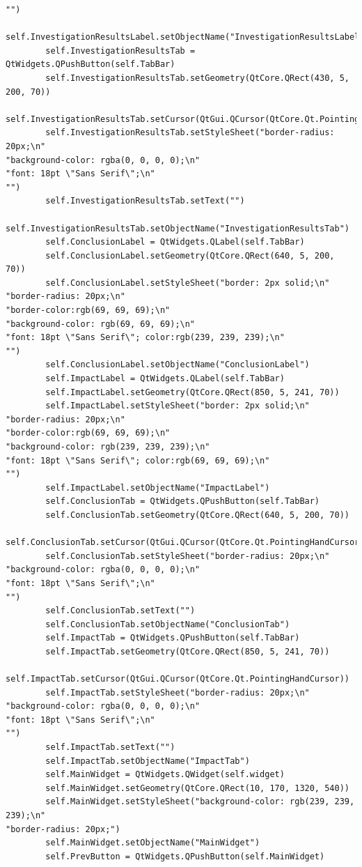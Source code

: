 \documentclass[12pt]{article}
\begin{document}
\begin{lstlisting}
"")
        self.InvestigationResultsLabel.setObjectName("InvestigationResultsLabel")
        self.InvestigationResultsTab = QtWidgets.QPushButton(self.TabBar)
        self.InvestigationResultsTab.setGeometry(QtCore.QRect(430, 5, 200, 70))
        self.InvestigationResultsTab.setCursor(QtGui.QCursor(QtCore.Qt.PointingHandCursor))
        self.InvestigationResultsTab.setStyleSheet("border-radius: 20px;\n"
"background-color: rgba(0, 0, 0, 0);\n"
"font: 18pt \"Sans Serif\";\n"
"")
        self.InvestigationResultsTab.setText("")
        self.InvestigationResultsTab.setObjectName("InvestigationResultsTab")
        self.ConclusionLabel = QtWidgets.QLabel(self.TabBar)
        self.ConclusionLabel.setGeometry(QtCore.QRect(640, 5, 200, 70))
        self.ConclusionLabel.setStyleSheet("border: 2px solid;\n"
"border-radius: 20px;\n"
"border-color:rgb(69, 69, 69);\n"
"background-color: rgb(69, 69, 69);\n"
"font: 18pt \"Sans Serif\"; color:rgb(239, 239, 239);\n"
"")
        self.ConclusionLabel.setObjectName("ConclusionLabel")
        self.ImpactLabel = QtWidgets.QLabel(self.TabBar)
        self.ImpactLabel.setGeometry(QtCore.QRect(850, 5, 241, 70))
        self.ImpactLabel.setStyleSheet("border: 2px solid;\n"
"border-radius: 20px;\n"
"border-color:rgb(69, 69, 69);\n"
"background-color: rgb(239, 239, 239);\n"
"font: 18pt \"Sans Serif\"; color:rgb(69, 69, 69);\n"
"")
        self.ImpactLabel.setObjectName("ImpactLabel")
        self.ConclusionTab = QtWidgets.QPushButton(self.TabBar)
        self.ConclusionTab.setGeometry(QtCore.QRect(640, 5, 200, 70))
        self.ConclusionTab.setCursor(QtGui.QCursor(QtCore.Qt.PointingHandCursor))
        self.ConclusionTab.setStyleSheet("border-radius: 20px;\n"
"background-color: rgba(0, 0, 0, 0);\n"
"font: 18pt \"Sans Serif\";\n"
"")
        self.ConclusionTab.setText("")
        self.ConclusionTab.setObjectName("ConclusionTab")
        self.ImpactTab = QtWidgets.QPushButton(self.TabBar)
        self.ImpactTab.setGeometry(QtCore.QRect(850, 5, 241, 70))
        self.ImpactTab.setCursor(QtGui.QCursor(QtCore.Qt.PointingHandCursor))
        self.ImpactTab.setStyleSheet("border-radius: 20px;\n"
"background-color: rgba(0, 0, 0, 0);\n"
"font: 18pt \"Sans Serif\";\n"
"")
        self.ImpactTab.setText("")
        self.ImpactTab.setObjectName("ImpactTab")
        self.MainWidget = QtWidgets.QWidget(self.widget)
        self.MainWidget.setGeometry(QtCore.QRect(10, 170, 1320, 540))
        self.MainWidget.setStyleSheet("background-color: rgb(239, 239, 239);\n"
"border-radius: 20px;")
        self.MainWidget.setObjectName("MainWidget")
        self.PrevButton = QtWidgets.QPushButton(self.MainWidget)

\end{lstlisting}
\end{document}
